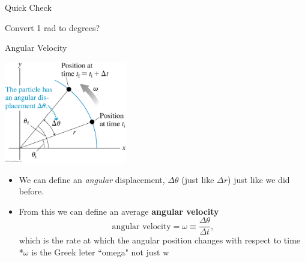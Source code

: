 \documentclass{beamer}
\begin{document}
\begin{frame}{Quick Check}
\begin{center}
   Convert 1 rad to degrees? \\
\end{center}
\end{frame}


\begin{frame}{Angular Velocity}
\begin{center}
   \includegraphics[width=0.4\textwidth]{../figures/04_23_Figure.jpg}
\end{center}
\begin{itemize}
   \item We can define an {\it angular} displacement, $\Delta\theta$ (just like $\Delta r$) just like we did before.
   \item<2-> From this we can define an average {\bf angular velocity}
   \begin{equation*}
      \text{angular velocity} = \omega \equiv \frac{\Delta\theta}{\Delta t},
   \end{equation*}
   which is the rate at which the angular position changes with respect to time \\ *$\omega$ is the Greek leter ``omega" not just w
\end{itemize}
\end{frame}
\end{document}
